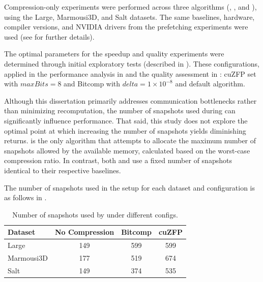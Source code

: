 \documentclass[Ingles]{ic-tese-v3}
\begin{document}
Compression-only experiments were performed across three \checkpointing algorithms (\revolve, \zcut, and \uniform), using the Large, Marmousi3D, and Salt datasets. The same baselines, hardware, compiler versions, and NVIDIA drivers from the prefetching experiments were used (see  for further details).

The optimal \compression parameters for the speedup and quality experiments were determined through initial exploratory tests (described in ). These configurations, applied in the performance analysis in  and the quality assessment in : cuZFP set with $maxBits=8$ and Bitcomp with $delta=1\times10^{-8}$ and default algorithm.


Although this dissertation primarily addresses communication bottlenecks rather than minimizing recomputation, the number of snapshots used during \checkpointing can significantly influence performance. That said, this study does not explore the optimal point at which increasing the number of snapshots yields diminishing returns. \uniform is the only \checkpointing algorithm that attempts to allocate the maximum number of snapshots allowed by the available memory, calculated based on the worst-case compression ratio. In contrast, both \revolve and \zcut use a fixed number of snapshots identical to their respective baselines.

The number of snapshots used in the \uniform setup for each dataset and \compression configuration is as follows in .

\begin{table}[h!]
\centering
\begin{tabular}{|l|c|c|c|}
\hline
\rowcolor[HTML]{C0C0C0}
\textbf{Dataset} & \textbf{No Compression} & \textbf{Bitcomp} & \textbf{cuZFP} \\ \hline
Large           & 149                     & 599              & 599            \\ \hline
Marmousi3D      & 177                     & 519              & 674            \\ \hline
Salt            & 149                     & 374              & 535            \\ \hline
\end{tabular}
\caption[Number of snapshots used with \uniform (\compression)]{Number of snapshots used by \uniform under different \compression configs.}
\label{tab:uniform_snapshots}
\end{table}
\end{document}
